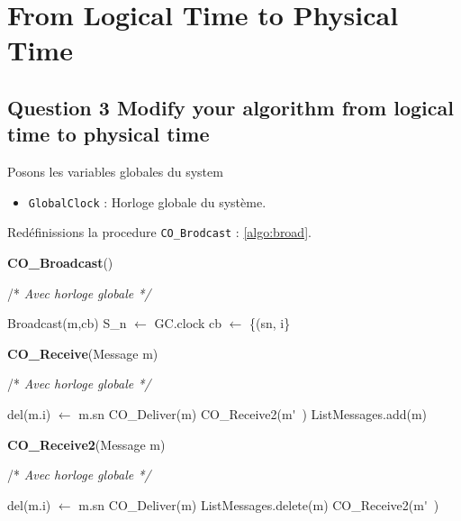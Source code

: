 \chapter{From Logical Time to Physical Time}

\section{Question 3 Modify your algorithm from logical time to physical time}

Posons les variables globales du system

\begin{itemize}
\item  \verb+GlobalClock+ : Horloge globale du système.
\end{itemize}


Redéfinissions la procedure \verb+CO_Brodcast+ : \ref{algo:broad}.

\begin{algorithm}
\caption{\textbf{CO\_Broadcast}()}
/* \textit{ Avec horloge globale */}
\label{algo:broad}
\begin{algorithmic}[1]
\STATE Broadcast(m,cb)
\STATE S_n $\leftarrow$ GC.clock
\STATE cb $\leftarrow $ \{(sn, i\}
\end{algorithmic}
\end{algorithm}



\begin{algorithm}
\caption{\textbf{CO\_Receive}(Message m)}
/* \textit{ Avec horloge globale */}
\label{algo:q3}
\begin{algorithmic}[1]
   \STATE  del(m.i) $\leftarrow$ m.sn
   \STATE  CO\_Deliver(m)
   CO\_Receive2(m\'~)
   \ENDFOR
   \ELSE
   \STATE ListMessages.add(m)
  \ENDIF  
\end{algorithmic}
\end{algorithm}


\begin{algorithm}
\caption{\textbf{CO\_Receive2}(Message m)}
/* \textit{ Avec horloge globale */}
\label{algo:receive2}
\begin{algorithmic}[1]
   \STATE  del(m.i) $\leftarrow$ m.sn
   \STATE  CO\_Deliver(m)
   \STATE ListMessages.delete(m)
   CO\_Receive2(m\'~)
   \ENDFOR
  \ENDIF  
\end{algorithmic}
\end{algorithm}
